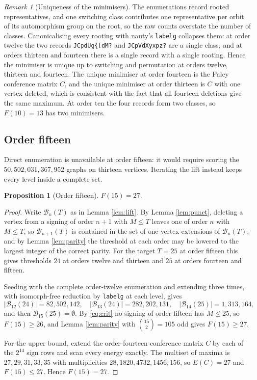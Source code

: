 \documentclass[11pt]{article}
\newtheorem{proposition}[theorem]{Proposition}
\theoremstyle{remark}
\newtheorem{remark}[theorem]{Remark}
\begin{document}
\begin{remark}[Uniqueness of the minimisers]\label{rem:unique}
The enumerations record rooted representatives, and one switching class
contributes one representative per orbit of its automorphism group on the
root, so the raw counts overstate the number of classes.  Canonicalising every
rooting with nauty's \texttt{labelg} collapses them:  at order twelve the two
records \texttt{JCpdUg\{[dM?} and \texttt{JCpVdXyxpz?} are a single class, and
at orders thirteen and fourteen there is a single record with a single
rooting.  Hence the minimiser is unique up to switching and permutation at
orders twelve, thirteen and fourteen.  The unique minimiser at order fourteen
is the Paley conference matrix $C$, and the unique minimiser at order thirteen
is $C$ with one vertex deleted, which is consistent with the fact that all
fourteen deletions give the same maximum.  At order ten the four records form
two classes, so $F(10)=13$ has two minimisers.
\end{remark}

\subsection{Order fifteen}

Direct enumeration is unavailable at order fifteen: it would require scoring
the $50{,}502{,}031{,}367{,}952$ graphs on thirteen vertices.  Iterating the
lift instead keeps every level inside a complete set.

\begin{proposition}[Order fifteen]\label{prop:15}
$F(15)=27$.
\end{proposition}

\begin{proof}
Write $\mathcal B_n(T)$ as in Lemma \ref{lem:lift}.  By Lemma
\ref{lem:punct}, deleting a vertex from a signing of order $n+1$ with $M\le T$
leaves one of order $n$ with $M\le T$, so $\mathcal B_{n+1}(T)$ is contained
in the set of one-vertex extensions of $\mathcal B_n(T)$; and by Lemma
\ref{lem:parity} the threshold at each order may be lowered to the largest
integer of the correct parity.  For the target $T=25$ at order fifteen this
gives thresholds $24$ at orders twelve and thirteen and $25$ at orders
fourteen and fifteen.

Seeding with the complete order-twelve enumeration and extending three times,
with isomorph-free reduction by \texttt{labelg} at each level, gives
\[
 |\mathcal B_{12}(24)|=82{,}502{,}142,\quad
 |\mathcal B_{13}(24)|=282{,}202{,}131,\quad
 |\mathcal B_{14}(25)|=1{,}313{,}164,
\]
and then $\mathcal B_{15}(25)=\emptyset$.  By \eqref{eq:crit} no signing of
order fifteen has $M\le25$, so $F(15)\ge26$, and Lemma \ref{lem:parity} with
$\binom{15}2=105$ odd gives $F(15)\ge27$.

For the upper bound, extend the order-fourteen conference matrix $C$ by each
of the $2^{14}$ sign rows and scan every energy exactly.  The multiset of
maxima is $27,29,31,33,35$ with multiplicities $28,1820,4732,1456,156$, so
$E(C)=27$ and $F(15)\le27$.  Hence $F(15)=27$.
\end{proof}
\end{document}

